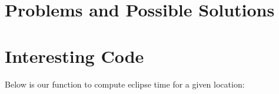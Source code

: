 \documentclass[10pt, onecolumn, draftclsnofoot, letterpaper, compsoc]{IEEEtran}
\begin{document}
\section{Problems and Possible Solutions}


\section{Interesting Code}

Below is our function to compute eclipse time for a given location: \\
\end{document}
